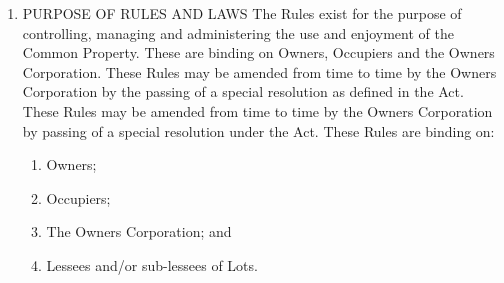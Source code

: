 \documentclass{article}
\begin{document}
\begin{enumerate}[label=\arabic*.]
\begin{enumerate}[label=\arabic{enumi}.\arabic*.]
\begin{enumerate}[label=\arabic{enumi}.\arabic*.]
\begin{enumerate}[label=(\arabic*)]
\begin{enumerate}[label=(\alph*)]

\item  must be given reasonable Notice of the request; and

\item  can delay, refuse or grant the consent or approval subject to any conditions which it deems fit in its absolute discretion.

\end{enumerate}

\item  If the consent or approval of the Owners Corporation is given to an act, matter or thing, then the Owners Corporation:

\begin{enumerate}[label=(\alph*)]

\item  may revoke that consent at any time, even if it was not expressed to be limited in time; and

\item  did not consent to the act, matter or thing in an ongoing manner or in any way give its consent to any repeat of the act, matter or thing.

\end{enumerate}

\end{enumerate}

\end{enumerate}

\item  PURPOSE OF RULES AND LAWS The Rules exist for the purpose of controlling, managing and administering the use and enjoyment of the Common Property. These are binding on Owners, Occupiers and the Owners Corporation. These Rules may be amended from time to time by the Owners Corporation by the passing of a special resolution as defined in the Act. These Rules may be amended from time to time by the Owners Corporation by passing of a special resolution under the Act. These Rules are binding on:

\begin{enumerate}[label=(\arabic*)]

\item  Owners;

\item  Occupiers;

\item  The Owners Corporation; and

\item  Lessees and/or sub-lessees of Lots.


\end{enumerate}
\end{enumerate}
\end{enumerate}
\end{document}

